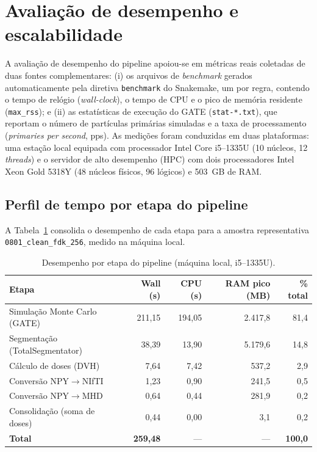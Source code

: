 \section{Avaliação de desempenho e escalabilidade}
\label{sec:desempenho}

A avaliação de desempenho do pipeline apoiou-se em métricas reais coletadas de
duas fontes complementares: (i) os arquivos de \textit{benchmark} gerados
automaticamente pela diretiva \texttt{benchmark} do Snakemake, um por regra,
contendo o tempo de relógio (\textit{wall-clock}), o tempo de CPU e o pico de
memória residente (\texttt{max\_rss}); e (ii) as estatísticas de execução do
GATE (\texttt{stat-*.txt}), que reportam o número de partículas primárias
simuladas e a taxa de processamento (\textit{primaries per second}, pps). As
medições foram conduzidas em duas plataformas: uma estação local equipada com
processador Intel Core i5--1335U (10 núcleos, 12 \textit{threads}) e o servidor
de alto desempenho (HPC) com dois processadores Intel Xeon Gold 5318Y
(48 núcleos físicos, 96 lógicos) e 503~GB de RAM.

\subsection{Perfil de tempo por etapa do pipeline}
\label{sec:perfil}

A Tabela~\ref{tab:benchmarks} consolida o desempenho de cada etapa para a
amostra representativa \texttt{0801\_clean\_fdk\_256}, medido na máquina local.

\begin{table}[htbp]
\centering
\caption{Desempenho por etapa do pipeline (máquina local, i5--1335U).}
\label{tab:benchmarks}
\begin{tabular}{lrrrr}
\toprule
\textbf{Etapa} & \textbf{Wall (s)} & \textbf{CPU (s)} & \textbf{RAM pico (MB)} & \textbf{\% total} \\
\midrule
Simulação Monte Carlo (GATE) & 211,15 & 194,05 & 2.417,8 & 81,4 \\
Segmentação (TotalSegmentator) & 38,39 & 13,90 & 5.179,6 & 14,8 \\
Cálculo de doses (DVH) & 7,64 & 7,42 & 537,2 & 2,9 \\
Conversão NPY$\rightarrow$NIfTI & 1,23 & 0,90 & 241,5 & 0,5 \\
Conversão NPY$\rightarrow$MHD & 0,64 & 0,44 & 281,9 & 0,2 \\
Consolidação (soma de doses) & 0,44 & 0,00 & 3,1 & 0,2 \\
\midrule
\textbf{Total} & \textbf{259,48} & --- & --- & \textbf{100,0} \\
\bottomrule
\end{tabular}
\end{table}

